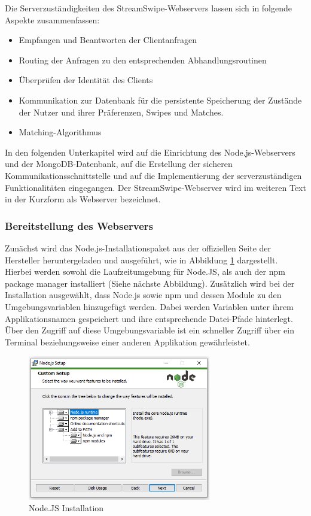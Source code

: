 Die Serverzuständigkeiten des StreamSwipe-Webservers lassen sich in folgende Aspekte zusammenfassen:
\begin{itemize}
\item Empfangen und Beantworten der Clientanfragen
\item Routing der Anfragen zu den entsprechenden Abhandlungsroutinen
\item Überprüfen der Identität des Clients
\item Kommunikation zur Datenbank für die persistente Speicherung der Zustände der Nutzer und ihrer Präferenzen, Swipes und Matches.
\item Matching-Algorithmus
\end{itemize} 

\noindent
In den folgenden Unterkapitel wird auf die Einrichtung des Node.js-Webservers und der MongoDB-Datenbank, auf die Erstellung der sicheren Kommunikationsschnittstelle und auf die Implementierung der serverzuständigen Funktionalitäten eingegangen. Der StreamSwipe-Webserver wird im weiteren Text in der Kurzform als Webserver bezeichnet. 

\subsubsection{Bereitstellung des Webservers}
Zunächst wird das Node.js-Installationspaket aus der offiziellen Seite der Hersteller heruntergeladen und ausgeführt, wie in Abbildung \ref{fig:installation_nodejs} dargestellt. Hierbei werden sowohl die Laufzeitumgebung für Node.JS, als auch der npm package manager installiert (Siehe nächste Abbildung). 
Zusätzlich wird bei der Installation ausgewählt, dass Node.js sowie npm und dessen Module zu den Umgebungsvariablen hinzugefügt werden. Dabei werden Variablen unter ihrem Applikationsnamen gespeichert und ihre entsprechende Datei-Pfade hinterlegt.
Über den Zugriff auf diese Umgebungsvariable ist ein schneller Zugriff über ein Terminal beziehungsweise einer anderen Applikation gewährleistet.


\begin{figure}[tbt]
\centering
\includegraphics[width=8cm]{images/nodejs_install.png}
\caption{Node.JS Installation}
\label{fig:installation_nodejs}
\end{figure}


